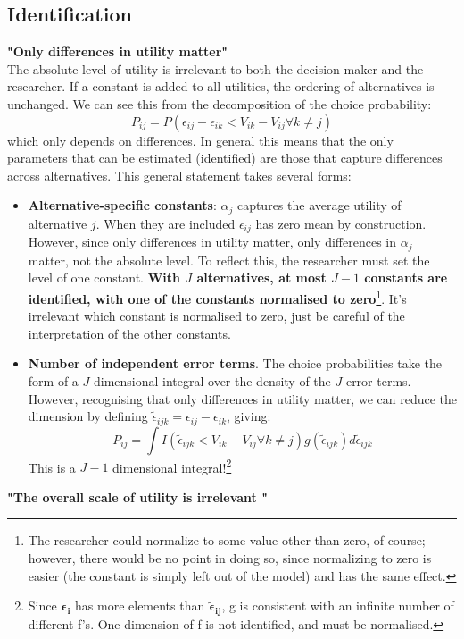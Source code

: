 \documentclass[DIV=14,titlepage=false]{scrreprt}
\begin{document}
\subsection{Identification}
\textbf{"Only differences in utility matter"}\\
The absolute level of utility is irrelevant to both the decision maker and the researcher. If a constant is added to all utilities, the ordering of alternatives is unchanged. We can see this from the decomposition of the choice probability:
\[
    P_{ij} = P(\epsilon_{ij} - \epsilon_{ik} < V_{ik} - V_{ij} \forall k \neq j)
\]
which only depends on differences. In general this means that the only parameters that can be estimated (identified) are those that capture differences across alternatives. This general statement takes several forms:
\begin{itemize}
    \item \textbf{Alternative-specific constants}: $\alpha_j$ captures the average utility of alternative $j$. When they are included $\epsilon_{ij}$ has zero mean by construction. However, since only differences in utility matter, only differences in $\alpha_j$ matter, not the absolute level. To reflect this, the researcher must set the level of one constant. \textbf{With $J$ alternatives, at most $J-1$ constants are identified, with one of the constants normalised to zero}\footnote{The researcher could normalize to some value other than zero, of course;
    however, there would be no point in doing so, since normalizing to
    zero is easier (the constant is simply left out of the model) and has the
    same effect.}. It's irrelevant which constant is normalised to zero, just be careful of the interpretation of the other constants.
    \item \textbf{Number of independent error terms}. The choice probabilities take the form of a $J$ dimensional integral over the density of the $J$ error terms. However, recognising that only differences in utility matter, we can reduce the dimension by defining $\tilde \epsilon_{ijk} = \epsilon_{ij} - \epsilon_{ik}$, giving:
    \[
        P_{ij} = \int I(\tilde \epsilon_{ijk} < V_{ik} - V_{ij} \forall k \neq j) g(\tilde \epsilon_{ijk}) d\tilde \epsilon_{ijk}
    \]
    This is a $J-1$ dimensional integral!\footnote{Since $\mathbf{\epsilon_i}$ has more elements than $\mathbf{\tilde \epsilon_{ij}}$, g is consistent with an infinite number of different f's. One dimension of f is not identified, and must be normalised.}
\end{itemize}
\textbf{"The overall scale of utility is irrelevant "}\\
\end{document}

